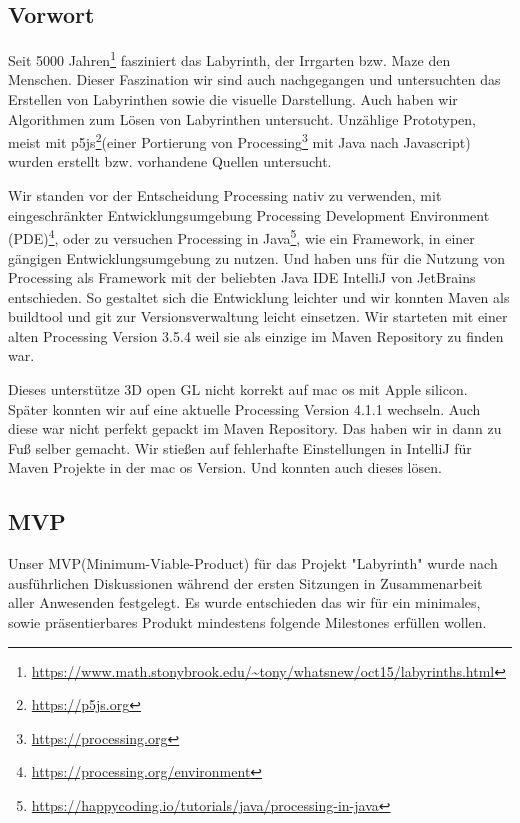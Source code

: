 
\subsection{Vorwort}\label{subsec:Vorwort}

Seit 5000 Jahren\footnote{\url{https://www.math.stonybrook.edu/~tony/whatsnew/oct15/labyrinths.html}} fasziniert das Labyrinth, der Irrgarten bzw. Maze den Menschen. Dieser Faszination wir sind auch nachgegangen und untersuchten das Erstellen von Labyrinthen sowie die visuelle Darstellung. Auch haben wir Algorithmen zum Lösen von Labyrinthen untersucht. Unzählige Prototypen, meist mit p5js\footnote{\url{https://p5js.org}}(einer Portierung von Processing\footnote{\url{https://processing.org}}  mit Java nach Javascript)  wurden erstellt bzw.  vorhandene Quellen untersucht.

	Wir standen vor der Entscheidung Processing nativ zu verwenden, mit eingeschränkter Entwicklungsumgebung Processing Development Environment (PDE)\footnote{\url{https://processing.org/environment}},  oder zu versuchen Processing in Java\footnote{\url{https://happycoding.io/tutorials/java/processing-in-java}}, wie ein Framework, in einer gängigen Entwicklungsumgebung zu nutzen. Und haben uns für die Nutzung von Processing als Framework mit der beliebten Java IDE IntelliJ von JetBrains entschieden. So gestaltet sich die Entwicklung leichter und wir konnten Maven als buildtool und git zur Versionsverwaltung leicht einsetzen. Wir starteten mit einer alten Processing Version 3.5.4 weil sie als einzige im Maven Repository zu finden war. 

	Dieses unterstütze 3D open GL nicht korrekt auf mac os mit Apple silicon. Später konnten wir auf eine aktuelle Processing Version 4.1.1 wechseln. Auch diese war nicht perfekt gepackt im Maven Repository. Das haben wir in dann zu Fuß selber gemacht. Wir stießen auf fehlerhafte Einstellungen in IntelliJ für Maven Projekte in der mac os Version. Und konnten auch dieses lösen.

\subsection{MVP}\label{subsec:mvp}
	Unser MVP(Minimum-Viable-Product) für das Projekt "Labyrinth"  wurde nach ausführlichen Diskussionen während der ersten Sitzungen in Zusammenarbeit aller Anwesenden festgelegt. Es wurde entschieden das wir für ein minimales, sowie präsentierbares Produkt mindestens folgende Milestones erfüllen wollen.
	
